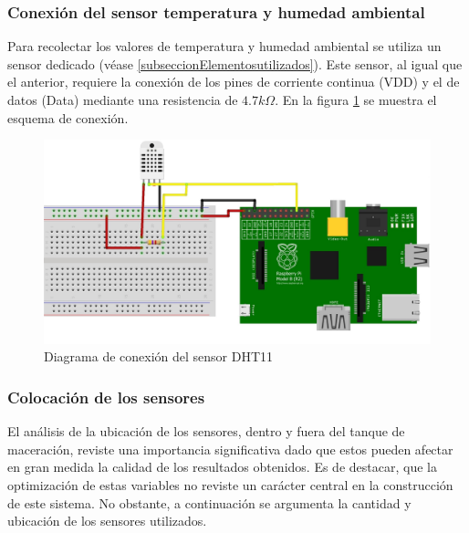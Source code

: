     \subsubsection{Conexión del sensor temperatura y humedad ambiental}
        \par Para recolectar los valores de temperatura y humedad ambiental se utiliza un sensor dedicado (véase \ref{subseccionElementosutilizados}). Este sensor, al igual que el anterior, requiere la conexión de los pines de corriente continua (VDD) y el de datos (Data) mediante una resistencia de $4.7k\Omega$. En la figura \ref{fig:EsquemaDHT11} se muestra el esquema de conexión.
        \begin{figure}
            \centering
            \includegraphics[scale = 0.8]{DiagramaSensorDHT11_bb.jpg}
            \caption{Diagrama de conexión del sensor DHT11}
            \label{fig:EsquemaDHT11}
        \end{figure}
    
    \subsubsection{Colocación de los sensores}
    \label{colocacionDeSensores}
    El análisis de la ubicación de los sensores, dentro y fuera del tanque de maceración, reviste una importancia significativa dado que estos pueden afectar en gran medida la calidad de los resultados obtenidos. Es de destacar, que la optimización de estas variables no reviste un carácter central en la construcción de este sistema. No obstante, a continuación se argumenta la cantidad y ubicación de los sensores utilizados.
    
